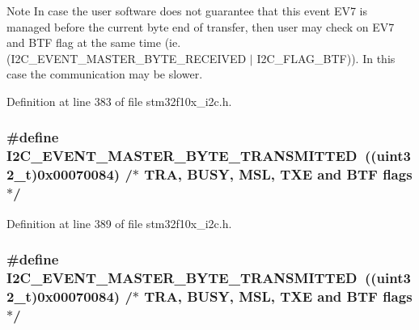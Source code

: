 \begin{DoxyNote}{Note}
In case the user software does not guarantee that this event E\+V7 is managed before the current byte end of transfer, then user may check on E\+V7 and B\+TF flag at the same time (ie. (I2\+C\+\_\+\+E\+V\+E\+N\+T\+\_\+\+M\+A\+S\+T\+E\+R\+\_\+\+B\+Y\+T\+E\+\_\+\+R\+E\+C\+E\+I\+V\+ED $\vert$ I2\+C\+\_\+\+F\+L\+A\+G\+\_\+\+B\+TF)). In this case the communication may be slower. 
\end{DoxyNote}


Definition at line 383 of file stm32f10x\+\_\+i2c.\+h.

\subsubsection[{\texorpdfstring{I2\+C\+\_\+\+E\+V\+E\+N\+T\+\_\+\+M\+A\+S\+T\+E\+R\+\_\+\+B\+Y\+T\+E\+\_\+\+T\+R\+A\+N\+S\+M\+I\+T\+T\+ED}{I2C_EVENT_MASTER_BYTE_TRANSMITTED}}]{\setlength{\rightskip}{0pt plus 5cm}\#define I2\+C\+\_\+\+E\+V\+E\+N\+T\+\_\+\+M\+A\+S\+T\+E\+R\+\_\+\+B\+Y\+T\+E\+\_\+\+T\+R\+A\+N\+S\+M\+I\+T\+T\+ED~(({\bf uint32\+\_\+t})0x00070084)  /$\ast$ T\+R\+A, B\+U\+S\+Y, M\+S\+L, T\+X\+E and B\+T\+F flags $\ast$/}\hypertarget{group___i2_c___events_ga8fe3b96b54e3c38e1de5d48536039c8f}{}\label{group___i2_c___events_ga8fe3b96b54e3c38e1de5d48536039c8f}


Definition at line 389 of file stm32f10x\+\_\+i2c.\+h.

\subsubsection[{\texorpdfstring{I2\+C\+\_\+\+E\+V\+E\+N\+T\+\_\+\+M\+A\+S\+T\+E\+R\+\_\+\+B\+Y\+T\+E\+\_\+\+T\+R\+A\+N\+S\+M\+I\+T\+T\+ED}{I2C_EVENT_MASTER_BYTE_TRANSMITTED}}]{\setlength{\rightskip}{0pt plus 5cm}\#define I2\+C\+\_\+\+E\+V\+E\+N\+T\+\_\+\+M\+A\+S\+T\+E\+R\+\_\+\+B\+Y\+T\+E\+\_\+\+T\+R\+A\+N\+S\+M\+I\+T\+T\+ED~(({\bf uint32\+\_\+t})0x00070084)  /$\ast$ T\+R\+A, B\+U\+S\+Y, M\+S\+L, T\+X\+E and B\+T\+F flags $\ast$/}\hypertarget{group___i2_c___events_ga8fe3b96b54e3c38e1de5d48536039c8f}{}\label{group___i2_c___events_ga8fe3b96b54e3c38e1de5d48536039c8f}



